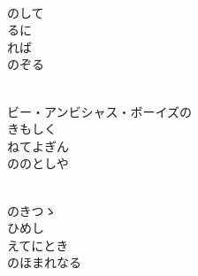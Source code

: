 \documentclass[10pt,b5j]{tarticle} %
\begin{document}
\vspace{1.5em} %
\newcommand{\linespace}{0.5em} %
\newcommand{\blocksize}{0.5\hsize} %
\newcommand{\itemmargin}{3em} %
\begin{enumerate} %
    \setlength{\itemindent}{\itemmargin} %
    \begin{minipage}[c]{\blocksize}
    
        \vspace{\linespace}
        \item~\\
        のして\\
        るに\\
        れば\\
        のぞる
        
    \end{minipage}
    \begin{minipage}[c]{\blocksize}
        
        \vspace{\linespace}
        \item~\\
        ビー・アンビシャス・ボーイズの\\
        きもしく\\
        ねてよぎん\\
        ののとしや
        
    \end{minipage}
    \begin{minipage}[c]{\blocksize}
        
        \vspace{\linespace}
        \item~\\
        のきつゝ\\
        ひめし\\
        えてにとき\\
        のほまれなる
        

\end{minipage}
\end{enumerate}
\end{document}
